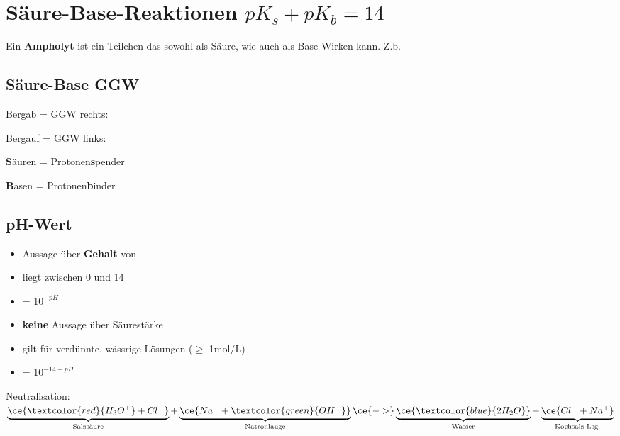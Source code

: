 \section{Säure-Base-Reaktionen $pK_{s}+ pK_{b} = 14$}
Ein \textbf{Ampholyt} ist ein Teilchen das sowohl als Säure, wie auch als Base Wirken kann. 
Z.b. 
\subsection{Säure-Base GGW}
    \begin{minipage}{0.65\columnwidth}
        Bergab = GGW rechts: 

        Bergauf = GGW links: 
    \end{minipage}
    \hfill
    \begin{minipage}{0.33\columnwidth}
        \textbf{S}äuren = Protonen\textbf{s}pender

        \textbf{B}asen = Protonen\textbf{b}inder
    \end{minipage}

\subsection{pH-Wert}
    \begin{minipage}{0.4\columnwidth}
        \begin{itemize}
            \item Aussage über \textbf{Gehalt} von 
            \item liegt zwischen 0 und 14
            \item \ce{[H3O+]} = $10^{-pH}$
        \end{itemize}
    \end{minipage}
    \hfill
    \begin{minipage}{0.59\columnwidth}
        \begin{itemize}
            \item \textbf{keine} Aussage über Säurestärke
            \item gilt für verdünnte, wässrige Lösungen ($\geq$ 1mol/L)
            \item \ce{[OH^-]} = $10^{-14+pH}$
        \end{itemize}
    \end{minipage}
    
    Neutralisation: $\underbrace{\ce{\textcolor{red}{H_3O^+} + {Cl^-}}}_{\text{Salzsäure}} + \underbrace{\ce{{Na^+} + \textcolor{green}{OH^-}}}_{\text{Natronlauge}} \ce{->} \underbrace{\ce{\textcolor{blue}{2 H_2O}}}_{\text{Wasser}} + \underbrace{\ce{{Cl^-} + {Na^+}}}_{\text{Kochsalz-Lsg.}}$